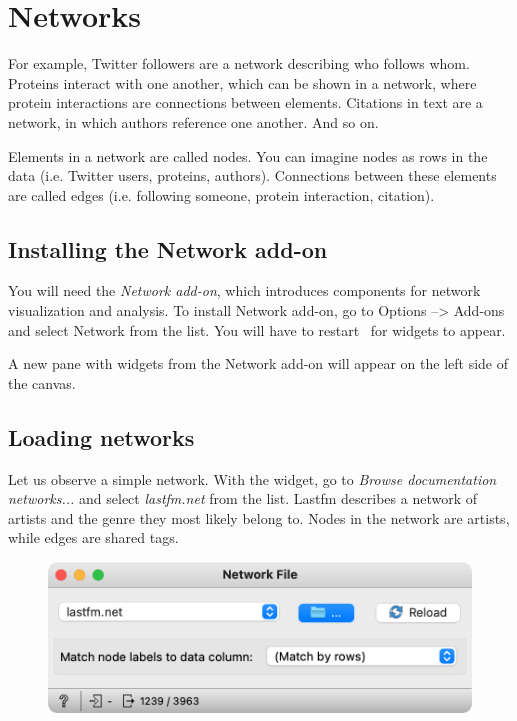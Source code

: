 \chapter{Networks}

 For example, Twitter followers are a network describing who follows whom. Proteins interact with one another, which can be shown in a network, where protein interactions are connections between elements. Citations in text are a network, in which authors reference one another. And so on.

Elements in a network are called nodes. You can imagine nodes as rows in the data (i.e. Twitter users, proteins, authors). Connections between these elements are called edges (i.e. following someone, protein interaction, citation).

\section{Installing the Network add-on}

You will need the \emph{Network add-on}, which introduces components for network visualization and analysis. To install Network add-on, go to Options --> Add-ons and select Network from the list. You will have to restart \mutation\ for widgets to appear.

A new pane with widgets from the Network add-on will appear on the left side of the canvas.

\section{Loading networks}

Let us observe a simple network. With the  widget, go to \emph{Browse documentation networks...} and select \emph{lastfm.net} from the list. Lastfm describes a network of artists and the genre they most likely belong to. Nodes in the network are artists, while edges are shared tags.

\vspace{-0.2cm}
\begin{figure}[h]
  \centering
  \includegraphics[width=\linewidth]{network-file.png}%
  \caption{$\;$}
\end{figure}
\vspace{-0.3cm}

